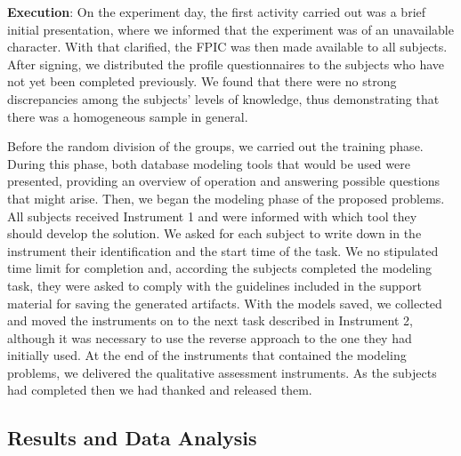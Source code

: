 \documentclass[a4paper,twoside,anonymous]{article}
\begin{document}
\textbf{Execution}: On the experiment day, the first activity carried out was a brief initial presentation, where we informed that the experiment was of an unavailable character.
With that clarified, the FPIC was then made available to all subjects.
After signing, we distributed the profile questionnaires to the subjects who have not yet been completed previously.
We found that there were no strong discrepancies among the subjects' levels of knowledge, thus demonstrating that there was a homogeneous sample in general.

Before the random division of the groups, we carried out the training phase.
During this phase, both database modeling tools that would be used were presented, providing an overview of operation and answering possible questions that might arise.
Then, we began the modeling phase of the proposed problems.
All subjects received Instrument 1 and were informed with which tool they should develop the solution.
We asked for each subject to write down in the instrument their identification and the start time of the task.
We no stipulated time limit for completion and, according the subjects completed the modeling task, they were asked to comply with the guidelines included in the support material for saving the generated artifacts.
With the models saved, we collected and moved the instruments on to the next task described in Instrument 2, although it was necessary to use the reverse approach to the one they had initially used.
At the end of the instruments that contained the modeling problems, we delivered the qualitative assessment instruments.
As the subjects had completed %
then we had thanked and released them.

\subsection{Results and Data Analysis}

\end{document}
